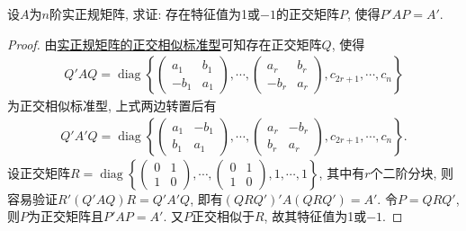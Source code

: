 \documentclass[../../main.tex]{subfiles}
\begin{document}
\begin{example}
设\( A \)为\( n \)阶实正规矩阵, 求证: 存在特征值为1或\(-1\)的正交矩阵\( P \), 使得\( P'AP = A' \).
\end{example}
\begin{proof}
由\hyperref[theorem:实正规矩阵的正交相似标准型]{实正规矩阵的正交相似标准型}可知存在正交矩阵$Q$, 使得
\begin{align*}
Q'AQ = \operatorname{diag}\left\{ \begin{pmatrix} a_1 & b_1 \\ -b_1 & a_1 \end{pmatrix}, \cdots, \begin{pmatrix} a_r & b_r \\ -b_r & a_r \end{pmatrix}, c_{2r+1}, \cdots, c_n \right\}
\end{align*}
为正交相似标准型, 上式两边转置后有
\begin{align*}
Q'A'Q = \operatorname{diag}\left\{ \begin{pmatrix} a_1 & -b_1 \\ b_1 & a_1 \end{pmatrix}, \cdots, \begin{pmatrix} a_r & -b_r \\ b_r & a_r \end{pmatrix}, c_{2r+1}, \cdots, c_n \right\}.
\end{align*}
设正交矩阵\( R = \operatorname{diag}\left\{ \begin{pmatrix} 0 & 1 \\ 1 & 0 \end{pmatrix}, \cdots, \begin{pmatrix} 0 & 1 \\ 1 & 0 \end{pmatrix}, 1, \cdots, 1 \right\} \), 其中有\( r \)个二阶分块, 则容易验证\( R'(Q'AQ)R = Q'A'Q \), 即有\( (QRQ')'A(QRQ') = A' \). 令\( P = QRQ' \), 则\( P \)为正交矩阵且\( P'AP = A' \). 又\( P \)正交相似于\( R \), 故其特征值为1或\(-1\). 

\end{proof}
\end{document}
